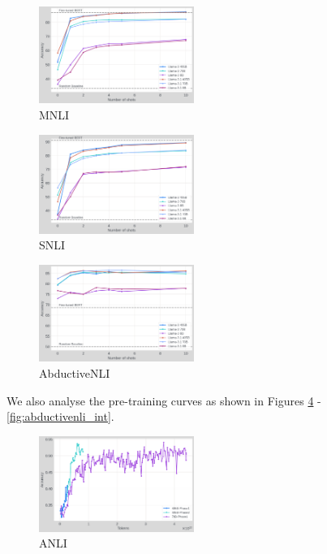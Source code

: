 \begin{figure}[t]
    \centering
    \includegraphics[width=0.45\textwidth]{nli_plots/mnli_matched.png}
    \caption{MNLI}
    \label{fig:mnli}
\end{figure}

\begin{figure}[t]
    \centering
    \includegraphics[width=0.45\textwidth]{nli_plots/snli.png}
    \caption{SNLI}
    \label{fig:snli}
\end{figure}

\begin{figure}[t]
    \centering
    \includegraphics[width=0.45\textwidth]{nli_plots/abductivenli.png}
    \caption{AbductiveNLI}
    \label{fig:abductivenli}
\end{figure}

We also analyse the pre-training curves as shown in Figures \ref{fig:anli_int} - \ref{fig:abductivenli_int}.

\begin{figure}[t]
    \centering
    \includegraphics[width=0.45\textwidth]{nli_plots/anli_intermediate.png}
    \caption{ANLI}
    \label{fig:anli_int}
\end{figure}

